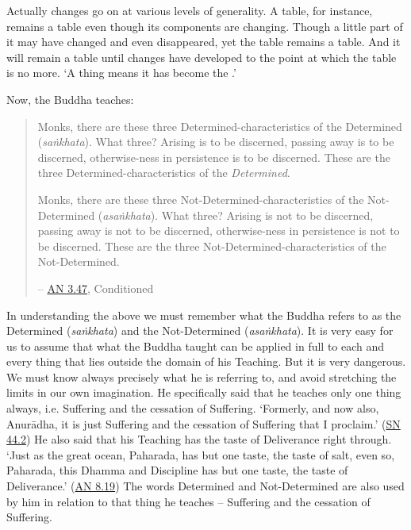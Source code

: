 Actually changes go on at various levels of generality. A table, for instance, remains a table even though its components are changing. Though a little part of it may have changed and even disappeared, yet the table remains a table. And it will remain a table until changes have developed to the point at which the table is no more. `A thing  means it has become the .'

Now, the Buddha teaches:

\begin{quote}
Monks, there are these three Determined-characteristics of the Determined (\emph{saṅkhata}). What three? Arising is to be discerned, passing away is to be discerned, otherwise-ness in persistence is to be discerned. These are the three Determined-characteristics of the \emph{Determined}.

Monks, there are these three Not-Determined-characteristics of the Not-Determined (\emph{asaṅkhata}). What three? Arising is not to be discerned, passing away is not to be discerned, otherwise-ness in persistence is not to be discerned. These are the three Not-Determined-characteristics of the Not-Determined.

 -- \href{https://suttacentral.net/an3.47/en/bodhi}{AN 3.47}, Conditioned
\end{quote}

In understanding the above we must remember what the Buddha refers to as the Determined (\emph{saṅkhata}) and the Not-Determined (\emph{asaṅkhata}). It is very easy for us to assume that what the Buddha taught can be applied in full to each and every thing that lies outside the domain of his Teaching. But it is very dangerous. We must know always precisely what he is referring to, and avoid stretching the limits in our own imagination. He specifically said that he teaches only one thing always, i.e. Suffering and the cessation of Suffering. `Formerly, and now also, Anurādha, it is just Suffering and the cessation of Suffering that I proclaim.' (\href{https://suttacentral.net/sn44.2/en/sujato}{SN 44.2}) He also said that his Teaching has the taste of Deliverance right through. `Just as the great ocean, Paharada, has but one taste, the taste of salt, even so, Paharada, this Dhamma and Discipline has but one taste, the taste of Deliverance.' (\href{https://suttacentral.net/an8.19/en/bodhi}{AN 8.19}) The words Determined and Not-Determined are also used by him in relation to that  thing he teaches -- Suffering and the cessation of Suffering.

